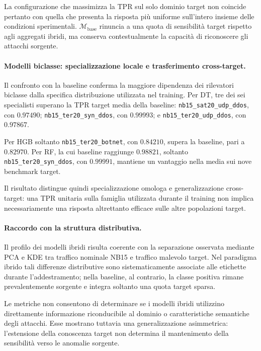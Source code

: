 La configurazione che massimizza la TPR sul solo dominio target non coincide pertanto con quella che presenta la risposta più uniforme sull'intero insieme delle condizioni sperimentali. 
$\mathcal{M}_{\mathrm{base}}$ rinuncia a una quota di sensibilità target rispetto agli aggregati ibridi, ma conserva contestualmente la capacità di riconoscere gli attacchi sorgente.

\paragraph{Modelli biclasse: specializzazione locale e trasferimento cross-target.}
Il confronto con la baseline conferma la maggiore dipendenza dei rilevatori biclasse dalla specifica distribuzione utilizzata nel training. 
Per DT, tre dei sei specialisti superano la TPR target media della baseline: \texttt{nb15\_sat20\_udp\_ddos}, con $0.97490$; \texttt{nb15\_ter20\_syn\_ddos}, con $0.99993$; e \newline \texttt{nb15\_ter20\_udp\_ddos}, con $0.97867$.

Per HGB soltanto \texttt{nb15\_ter20\_botnet}, con $0.84210$, supera la baseline, pari a $0.82970$. 
Per RF, la cui baseline raggiunge $0.98821$, soltanto \texttt{nb15\_ter20\_syn\_ddos}, con $0.99991$, mantiene un vantaggio nella media sui nove benchmark target.

Il risultato distingue quindi specializzazione omologa e generalizzazione cross-target: una TPR unitaria sulla famiglia utilizzata durante il training non implica necessariamente una risposta altrettanto efficace sulle altre popolazioni target.

\paragraph{Raccordo con la struttura distributiva.}
Il profilo dei modelli ibridi risulta coerente con la separazione osservata mediante PCA e KDE tra traffico nominale NB15 e traffico malevolo target. 
Nel paradigma ibrido tali differenze distributive sono sistematicamente associate alle etichette durante l'addestramento; nella baseline, al contrario, la classe positiva rimane prevalentemente sorgente e integra soltanto una quota target sparsa.

Le metriche non consentono di determinare se i modelli ibridi utilizzino direttamente informazione riconducibile al dominio o caratteristiche semantiche degli attacchi. 
Esse mostrano tuttavia una generalizzazione asimmetrica: l'estensione della conoscenza target non determina il mantenimento della sensibilità verso le anomalie sorgente.

